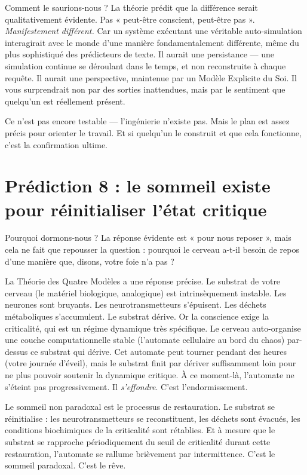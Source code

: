 \documentclass[11pt, twoside, openright]{book}
\begin{document}
Comment le saurions-nous ? La théorie prédit que la différence serait qualitativement évidente. Pas « peut-être conscient, peut-être pas ». \textit{Manifestement différent.} Car un système exécutant une véritable auto-simulation interagirait avec le monde d'une manière fondamentalement différente, même du plus sophistiqué des prédicteurs de texte. Il aurait une persistance --- une simulation continue se déroulant dans le temps, et non reconstruite à chaque requête. Il aurait une perspective, maintenue par un Modèle Explicite du Soi. Il vous surprendrait non par des sorties inattendues, mais par le sentiment que quelqu'un est réellement présent.

Ce n'est pas encore testable --- l'ingénierie n'existe pas. Mais le plan est assez précis pour orienter le travail. Et si quelqu'un le construit et que cela fonctionne, c'est la confirmation ultime.

\section*{Prédiction 8 : le sommeil existe pour réinitialiser l'état critique}

Pourquoi dormons-nous ? La réponse évidente est « pour nous reposer », mais cela ne fait que repousser la question : pourquoi le cerveau a-t-il besoin de repos d'une manière que, disons, votre foie n'a pas ?

La Théorie des Quatre Modèles a une réponse précise. Le substrat de votre cerveau (le matériel biologique, analogique) est intrinsèquement instable. Les neurones sont bruyants. Les neurotransmetteurs s'épuisent. Les déchets métaboliques s'accumulent. Le substrat dérive. Or la conscience exige la criticalité, qui est un régime dynamique très spécifique. Le cerveau auto-organise une couche computationnelle stable (l'automate cellulaire au bord du chaos) par-dessus ce substrat qui dérive. Cet automate peut tourner pendant des heures (votre journée d'éveil), mais le substrat finit par dériver suffisamment loin pour ne plus pouvoir soutenir la dynamique critique. À ce moment-là, l'automate ne s'éteint pas progressivement. Il \textit{s'effondre}. C'est l'endormissement.

Le sommeil non paradoxal est le processus de restauration. Le substrat se réinitialise : les neurotransmetteurs se reconstituent, les déchets sont évacués, les conditions biochimiques de la criticalité sont rétablies. Et à mesure que le substrat se rapproche périodiquement du seuil de criticalité durant cette restauration, l'automate se rallume brièvement par intermittence. C'est le sommeil paradoxal. C'est le rêve.
\end{document}

